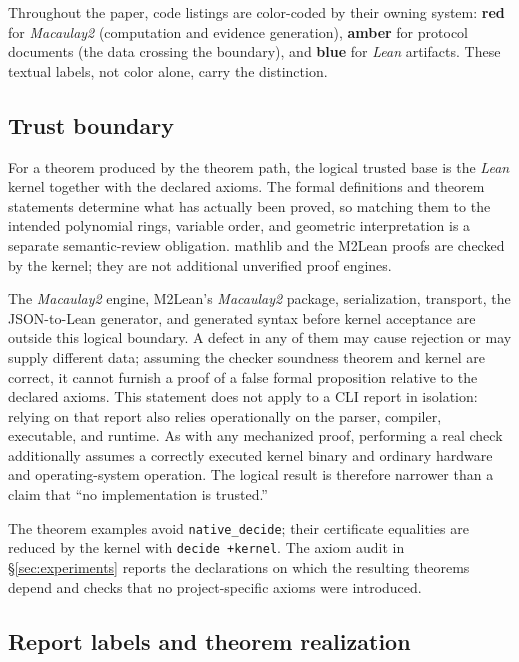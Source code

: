 \documentclass[11pt]{article}
\newcommand{\M}{\textit{Macaulay2}}
\newcommand{\lean}{\textit{Lean}}
\newcommand{\mathlib}{\textsf{mathlib}}
\newcommand{\code}[1]{\texttt{#1}}
\begin{document}
Throughout the paper, code listings are color-coded by their owning
system:
\textcolor{m2col}{\textbf{red}} for \M{} (computation and evidence
generation),
\textcolor{protocol}{\textbf{amber}} for protocol documents (the data
crossing the boundary), and \textcolor{leancol}{\textbf{blue}} for
\lean{} artifacts.  These textual labels, not color alone, carry the
distinction.

\subsection{Trust boundary}

For a theorem produced by the theorem path, the logical trusted base is
the \lean{} kernel together with the declared axioms.  The formal
definitions and theorem statements determine what has actually been
proved, so matching them to the intended polynomial rings, variable
order, and geometric interpretation is a separate semantic-review
obligation.  \mathlib{} and the M2Lean proofs are checked by the kernel;
they are not additional unverified proof engines.

The \M{} engine, M2Lean's \M{} package, serialization, transport, the
JSON-to-Lean generator, and generated syntax before kernel acceptance
are outside this logical boundary.  A defect in any of them may cause
rejection or may supply different data; assuming the checker soundness
theorem and kernel are correct, it cannot furnish a proof of a false
formal proposition relative to the declared axioms.  This statement does not apply to a CLI report in
isolation: relying on that report also relies operationally on the
parser, compiler, executable, and runtime.  As with any mechanized
proof, performing a real check additionally assumes a correctly
executed kernel binary and ordinary hardware and operating-system
operation.  The logical result is therefore narrower than a claim that
``no implementation is trusted.''

The theorem examples avoid \code{native\_decide}; their certificate
equalities are reduced by the kernel with \code{decide +kernel}.  The
axiom audit in \S\ref{sec:experiments} reports the declarations on
which the resulting theorems depend and checks that no project-specific
axioms were introduced.

\subsection{Report labels and theorem realization}
\end{document}
